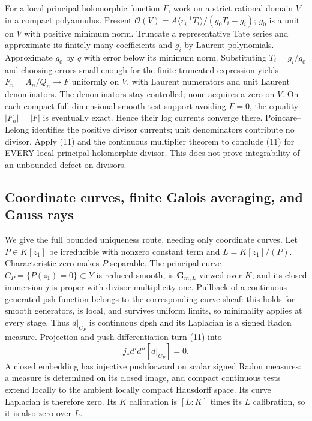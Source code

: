 \documentclass[11pt]{article}
\begin{document}
For a local principal holomorphic function $F$, work on a strict rational
domain $V$ in a compact polyannulus. Present
$\mathcal O(V)=A\langle r_i^{-1}T_i\rangle/(g_0T_i-g_i)$;
$g_0$ is a unit on $V$ with positive minimum norm.
Truncate a representative Tate series and approximate its finitely many
coefficients and $g_i$ by Laurent polynomials. Approximate $g_0$ by $q$
with error below its minimum norm. Substituting $T_i=g_i/g_0$ and choosing
errors small enough for the finite truncated expression yields
$F_n=A_n/Q_n\to F$ uniformly on $V$, with Laurent numerators and unit
Laurent denominators. The denominators stay controlled; none acquires a
zero on $V$. On each compact full-dimensional smooth test support avoiding
$F=0$, the equality $|F_n|=|F|$ is eventually exact. Hence their log currents
converge there. Poincare--Lelong identifies the positive divisor currents;
unit denominators contribute no divisor. Apply (11) and the continuous
multiplier theorem to conclude (11) for EVERY local principal holomorphic
divisor. This does not prove integrability of an unbounded defect on divisors.

\subsection{Coordinate curves, finite Galois averaging, and Gauss rays}
We give the full bounded uniqueness route, needing only coordinate curves.
Let $P\in K[z_1]$ be irreducible with nonzero constant term and
$L=K[z_1]/(P)$. Characteristic zero makes $P$ separable. The principal
curve $C_P=\{P(z_1)=0\}\subset Y$ is reduced smooth, is $\mathbf G_{m,L}$
viewed over $K$, and its closed immersion $j$ is proper with divisor
multiplicity one. Pullback of a continuous generated psh function belongs to
the corresponding curve sheaf: this holds for smooth generators, is local,
and survives uniform limits, so minimality applies at every stage.
Thus $d|_{C_P}$ is continuous dpsh and its Laplacian is a signed Radon
measure. Projection and push-differentiation turn (11) into
\[
 j_*d'd''[d|_{C_P}]=0.
\]
A closed embedding has injective pushforward on scalar signed Radon measures:
a measure is determined on its closed image, and compact continuous tests
extend locally to the ambient locally compact Hausdorff space.
Its curve Laplacian is therefore zero. Its $K$ calibration is $[L:K]$
times its $L$ calibration, so it is also zero over $L$.
\end{document}
